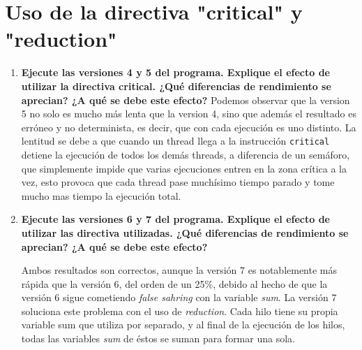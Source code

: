 \documentclass{report}
\newcommand\tab[1][0.6cm]{\hspace*{#1}}
\newcommand\nl{\newline\tab}
\begin{document}
	\section{Uso	de	la	directiva	 "critical"
		y "reduction"}
	\begin{enumerate}
		\item {\textbf{\tab Ejecute	 las	 versiones	 4	 y	 5	 del	 programa.	 Explique	 el	 efecto	 de	 utilizar	 la	
				directiva	critical.	¿Qué	diferencias	de	rendimiento	se	aprecian?	¿A	qué	se	debe	este	efecto?	}\nl
			Podemos observar que la version 5 no solo es mucho más lenta que la version 4, sino que además el resultado es erróneo y no determinista, es decir, que con cada ejecución es uno distinto. La lentitud se debe a que cuando un thread llega a la instrucción \texttt{critical} detiene la ejecución de todos los demás threads, a diferencia de un semáforo, que simplemente impide que varias ejecuciones entren en la zona crítica a la vez, esto provoca que cada thread pase muchísimo tiempo parado y tome mucho mas tiempo la ejecución total. 
		}
		
		\item{\textbf{\tab Ejecute	 las	 versiones	 6	 y	 7	 del	 programa.	 Explique	 el	 efecto	 de	 utilizar	 las	
				directiva	 utilizadas.	 ¿Qué	 diferencias	 de	 rendimiento	 se	 aprecian?	 ¿A	 qué	 se	 debe	 este	
				efecto?}\nl
			
			\tab Ambos resultados son correctos, aunque la versión 7 es notablemente más rápida que la versión 6, del orden de un 25\%, debido al hecho de que la versión 6 sigue cometiendo \textit{false sahring} con la variable \textit{sum}. La versión 7 soluciona este problema con el uso de \textit{reduction}. Cada hilo tiene su propia variable sum que utiliza por separado, y al final de la ejecución de los hilos, todas las variables \textit{sum} de éstos se suman para formar una sola.
		}
	\end{enumerate}
\end{document}
